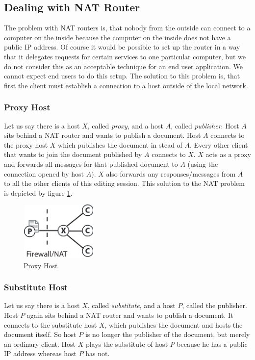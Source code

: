 \subsection{Dealing with NAT Router}
The problem with NAT routers is, that nobody from the outside can connect to a computer on the inside because the computer on the inside does not have a public IP address. Of course it would be possible to set up the router in a way that it delegates requests for certain services to one particular computer, but we do not consider this as an acceptable technique for an end user application. We cannot expect end users to do this setup. The solution to this problem is, that first the client must establish a connection to a host outside of the local network. 

\subsubsection{Proxy Host}
Let us say there is a host $X$, called \emph{proxy}, and a host $A$, called \emph{publisher}. Host $A$ sits behind a NAT router and wants to publish a document. Host $A$ connects to the proxy host $X$ which publishes the document in stead of $A$. Every other client that wants to join the document published by $A$ connects to $X$. $X$ acts as a proxy and forwards all messages for that published document to $A$ (using the connection opened by host $A$). $X$ also forwards any responses/messages from $A$ to all the other clients of this editing session. This solution to the NAT problem is depicted by figure \ref{fig:proxy}.

\begin{figure}[H]
 \centering
 \includegraphics[width=3.8cm,height=2.9cm]{../../images/net_proxy.eps}
 \caption{Proxy Host}
 \label{fig:proxy}
\end{figure}

\subsubsection{Substitute Host}
Let us say there is a host $X$, called \emph{substitute}, and a host $P$, called the publisher. Host $P$ again sits behind a NAT router and wants to publish a document. It connects to the substitute host $X$, which publishes the document and hosts the document itself. So host $P$ is no longer the publisher of the document, but merely an ordinary client. Host $X$ plays the substitute of host $P$ because he has a public IP address whereas host $P$ has not.


